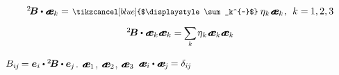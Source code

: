 \nopagebreak\vspace{-0.25em}\begin{equation*}\begin{array}{c}
\somebivalenttensor \dotp \mathboldae_k = \hspace{.2ex} \scalebox{0.82}{$\tikzcancel[blue]{$\displaystyle\sum_k^{~}$}$}\: \eigenvalue_{\hspace{-0.15ex}k} \hspace{.1ex} \mathboldae_k \hspace{.1ex}, \:\: k =\hspace{-0.1ex} 1, 2, 3
\\[.9em]
%
\somebivalenttensor \dotp \tikzmark{BeginEqualsEBrace} {\mathboldae_k \mathboldae_k} \tikzmark{EndEqualsEBrace} = \hspace{-0.1ex} \scalebox{.9}{$\displaystyle \sum_{\smash{k}}$} \hspace{.2ex} \eigenvalue_{\hspace{-0.15ex}k} \hspace{.1ex} \mathboldae_k \mathboldae_k
\end{array}\end{equation*}

\vspace{-0.25em}
${%
\somebivalenttensorcomponents{i\hspace{-0.1ex}j}
\hspace{-0.2ex} =
\bm{e}_i \dotp \somebivalenttensor \dotp \bm{e}_{\hspace{-0.1ex}j} }$.
${\mathboldae_1}$, ${\mathboldae_2}$, ${\mathboldae_3}$
${\mathboldae_i \dotp \mathboldae_{\hspace{-0.1ex}j} \hspace{-0.15ex} = \delta_{i\hspace{-0.1ex}j}}$

